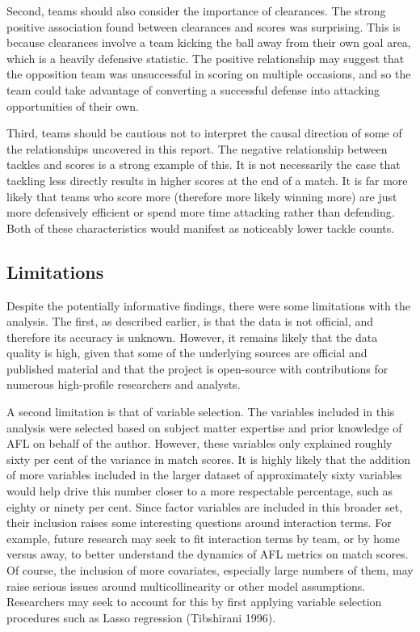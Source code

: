 \documentclass{article}
\begin{document}
Second, teams should also consider the importance of clearances. The
strong positive association found between clearances and scores was
surprising. This is because clearances involve a team kicking the ball
away from their own goal area, which is a heavily defensive statistic.
The positive relationship may suggest that the opposition team was
unsuccessful in scoring on multiple occasions, and so the team could
take advantage of converting a successful defense into attacking
opportunities of their own.

Third, teams should be cautious not to interpret the causal direction of
some of the relationships uncovered in this report. The negative
relationship between tackles and scores is a strong example of this. It
is not necessarily the case that tackling less directly results in
higher scores at the end of a match. It is far more likely that teams
who score more (therefore more likely winning more) are just more
defensively efficient or spend more time attacking rather than
defending. Both of these characteristics would manifest as noticeably
lower tackle counts.

\hypertarget{limitations}{%
\subsection{Limitations}\label{limitations}}

Despite the potentially informative findings, there were some
limitations with the analysis. The first, as described earlier, is that
the data is not official, and therefore its accuracy is unknown.
However, it remains likely that the data quality is high, given that
some of the underlying sources are official and published material and
that the project is open-source with contributions for numerous
high-profile researchers and analysts.

A second limitation is that of variable selection. The variables
included in this analysis were selected based on subject matter
expertise and prior knowledge of AFL on behalf of the author. However,
these variables only explained roughly sixty per cent of the variance in
match scores. It is highly likely that the addition of more variables
included in the larger dataset of approximately sixty variables would
help drive this number closer to a more respectable percentage, such as
eighty or ninety per cent. Since factor variables are included in this
broader set, their inclusion raises some interesting questions around
interaction terms. For example, future research may seek to fit
interaction terms by team, or by home versus away, to better understand
the dynamics of AFL metrics on match scores. Of course, the inclusion of
more covariates, especially large numbers of them, may raise serious
issues around multicollinearity or other model assumptions. Researchers
may seek to account for this by first applying variable selection
procedures such as Lasso regression (Tibshirani 1996).
\end{document}
